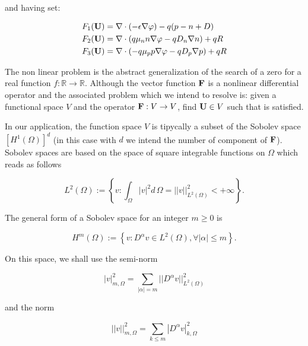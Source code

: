 and having set:

\begin{align*}
F_1(\mathbf{U}) & = \nabla \cdot (-\epsilon \nabla \varphi) - q(p-n+D) \\
F_2(\mathbf{U}) & = \nabla \cdot ( q\mu_n n \nabla \varphi - qD_n \nabla n )+qR \\
F_3(\mathbf{U}) & = \nabla \cdot (- q\mu_p p \nabla \varphi - qD_p \nabla p )+qR
\end{align*}

The non linear problem  is the abstract generalization of the search of a zero for a real function $f:\mathbb{R}\rightarrow\mathbb{R}$. Although the vector function $\mathbf{F}$ is a nonlinear differential operator and the associated problem which we intend to resolve is: given a functional space $V$ and the operator $\mathbf{F}:V\rightarrow V$, find $\mathbf{U}\in V$ such that  is satisfied.

In our application, the function space $V$ is tipycally a subset of the Sobolev space  $[H^1(\Omega)]^d$ (in this case with $d$ we intend the number of component of $\mathbf{F}$). Sobolev spaces are based on the space of square integrable functions on $\Omega$ which reads as follows

\begin{equation}
\label{space: L2}
L^2(\Omega) := \left\{ v : \int_{\Omega} |v|^2 d\,\Omega =||v||^2_{L^2(\Omega)}<+\infty \right\}.
\end{equation}

The general form of a Sobolev space for an integer $m\geq 0$ is

\begin{equation}
\label{space: Hm}
H^m(\Omega) := \left\{ v : D^{\alpha}v\in L^2(\Omega),\forall |\alpha|\leq m \right\}.
\end{equation}

On this space, we shall use the semi-norm

\begin{equation}
\label{eq: semiorm sobolev}
|v|_{m,\Omega}^2 = \sum_{|\alpha|=m} ||D^{\alpha}v||^2_{L^2(\Omega)}
\end{equation}

and the norm

\begin{equation}
\label{eq: norm sobolev}
||v||_{m,\Omega}^2 = \sum_{k\leq m} |D^{\alpha}v|^2_{k,\Omega}
\end{equation}

